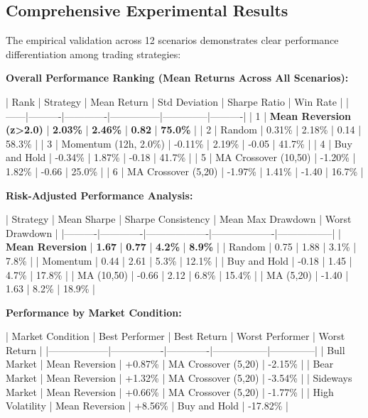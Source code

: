 \documentclass[11pt]{article}
\begin{document}
\subsection{Comprehensive Experimental Results}

The empirical validation across 12 scenarios demonstrates clear performance differentiation among trading strategies:

\textbf{Overall Performance Ranking (Mean Returns Across All Scenarios):}

| Rank | Strategy | Mean Return | Std Deviation | Sharpe Ratio | Win Rate |
|------|----------|-------------|---------------|--------------|----------|
| 1 | \textbf{Mean Reversion (z>2.0)} | \textbf{2.03\%} | \textbf{2.46\%} | \textbf{0.82} | \textbf{75.0\%} |
| 2 | Random | 0.31\% | 2.18\% | 0.14 | 58.3\% |
| 3 | Momentum (12h, 2.0\%) | -0.11\% | 2.19\% | -0.05 | 41.7\% |
| 4 | Buy and Hold | -0.34\% | 1.87\% | -0.18 | 41.7\% |
| 5 | MA Crossover (10,50) | -1.20\% | 1.82\% | -0.66 | 25.0\% |
| 6 | MA Crossover (5,20) | -1.97\% | 1.41\% | -1.40 | 16.7\% |

\textbf{Risk-Adjusted Performance Analysis:}

| Strategy | Mean Sharpe | Sharpe Consistency | Mean Max Drawdown | Worst Drawdown |
|----------|-------------|-------------------|-------------------|-----------------|
| \textbf{Mean Reversion} | \textbf{1.67} | \textbf{0.77} | \textbf{4.2\%} | \textbf{8.9\%} |
| Random | 0.75 | 1.88 | 3.1\% | 7.8\% |
| Momentum | 0.44 | 2.61 | 5.3\% | 12.1\% |
| Buy and Hold | -0.18 | 1.45 | 4.7\% | 17.8\% |
| MA (10,50) | -0.66 | 2.12 | 6.8\% | 15.4\% |
| MA (5,20) | -1.40 | 1.63 | 8.2\% | 18.9\% |

\textbf{Performance by Market Condition:}

| Market Condition | Best Performer | Best Return | Worst Performer | Worst Return |
|------------------|----------------|-------------|-----------------|--------------|
| Bull Market | Mean Reversion | +0.87\% | MA Crossover (5,20) | -2.15\% |
| Bear Market | Mean Reversion | +1.32\% | MA Crossover (5,20) | -3.54\% |
| Sideways Market | Mean Reversion | +0.66\% | MA Crossover (5,20) | -1.77\% |
| High Volatility | Mean Reversion | +8.56\% | Buy and Hold | -17.82\% |
\end{document}
